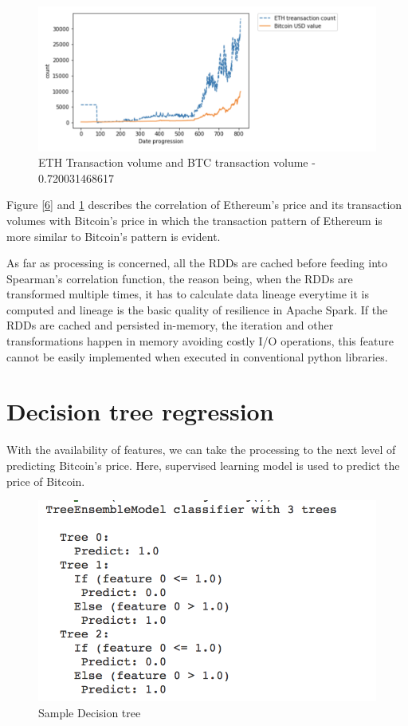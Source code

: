 \documentclass[sigconf]{acmart}
\begin{document}
\begin{figure}[!ht]
  \centering\includegraphics[width=\columnwidth]{images/ethtrancount.png}
  \caption{ETH Transaction volume and BTC transaction volume - 0.720031468617 }
  \label{7}
\end{figure}

Figure \ref{6} and \ref{7} describes the correlation of Ethereum's price and its transaction volumes with Bitcoin's price in which the transaction pattern of Ethereum is more similar to Bitcoin's pattern is evident. 

As far as processing is concerned, all the RDDs are cached before feeding into Spearman's correlation function, the reason being, when the RDDs are transformed multiple times, it has to calculate data lineage everytime it is computed and lineage is the basic quality of resilience in Apache Spark. If the RDDs are cached and persisted in-memory, the iteration and other transformations happen in memory avoiding costly I/O operations, this feature cannot be easily implemented when executed in conventional python libraries.


\section{Decision tree regression}
With the availability of features, we can take the processing to the next level of predicting Bitcoin's price. Here, supervised learning model is used to predict the price of Bitcoin.

\begin{figure}[!ht]
  \centering\includegraphics[width=\columnwidth]{images/Decisiontree.png}
  \caption{Sample Decision tree}
  \label{fig:8decisiongree}
\end{figure}
 
\end{document}
